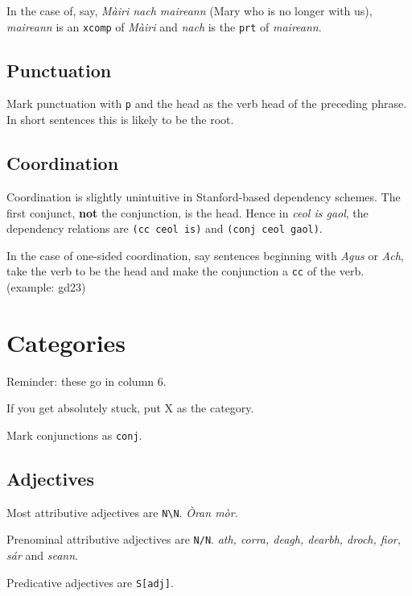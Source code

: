 \documentclass[a4paper]{article}
\begin{document}
 In the case of, say, \textit{M\`airi nach maireann} (Mary who is no longer with us), \textit{maireann} is an \texttt{xcomp} of \textit{M\`airi} and \textit{nach} is the \texttt{prt} of \textit{maireann}.

\subsection{Punctuation}

 Mark punctuation with \texttt{p} and the head as the verb head of the preceding phrase. In short sentences this is likely to be the root.

\subsection{Coordination}

 Coordination is slightly unintuitive in Stanford-based dependency schemes. The first conjunct, \textbf{not} the conjunction, is the head. Hence in \textit{ceol is gaol}, the dependency relations are \texttt{(cc ceol is)} and \texttt{(conj ceol gaol)}.

 In the case of one-sided coordination, say sentences beginning with \textit{Agus} or \textit{Ach}, take the verb to be the head and make the conjunction a \texttt{cc} of the verb. (example: gd23)

\section{Categories}

Reminder: these go in column 6.

 If you get absolutely stuck, put X as the category.

 Mark conjunctions as \texttt{conj}.

\subsection{Adjectives}

 Most attributive adjectives are \texttt{N\textbackslash N}. \textit{\`Oran m\`or}.

 Prenominal attributive adjectives are \texttt{N/N}. \textit{ath, corra, deagh, dearbh, droch, fior, s\'ar} and \textit{seann}.

 Predicative adjectives are \texttt{S[adj]}.
\end{document}
